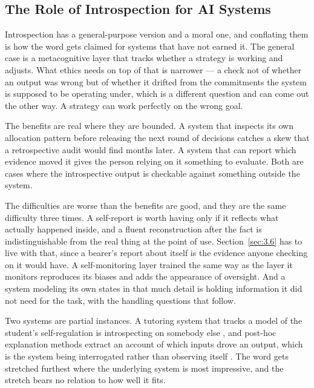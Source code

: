 \subsection{The Role of Introspection for AI Systems}
\label{sec:5.2.4}
Introspection has a general-purpose version and a moral one, and conflating them is how the word gets claimed for systems that have not earned it. The general case is a metacognitive layer that tracks whether a strategy is working and adjusts. What ethics needs on top of that is narrower — a check not of whether an output was wrong but of whether it drifted from the commitments the system is supposed to be operating under, which is a different question and can come out the other way. A strategy can work perfectly on the wrong goal.

The benefits are real where they are bounded. A system that inspects its own allocation pattern before releasing the next round of decisions catches a skew that a retrospective audit would find months later. A system that can report which evidence moved it gives the person relying on it something to evaluate. Both are cases where the introspective output is checkable against something outside the system.

The difficulties are worse than the benefits are good, and they are the same difficulty three times. A self-report is worth having only if it reflects what actually happened inside, and a fluent reconstruction after the fact is indistinguishable from the real thing at the point of use. Section~\ref{sec:3.6} has to live with that, since a bearer's report about itself is the evidence anyone checking on it would have. A self-monitoring layer trained the same way as the layer it monitors reproduces its biases and adds the appearance of oversight. And a system modeling its own states in that much detail is holding information it did not need for the task, with the handling questions that follow.

Two systems are partial instances. A tutoring system that tracks a model of the student's self-regulation is introspecting on somebody else \autocite{azevedo2011hypermedia}, and post-hoc explanation methods extract an account of which inputs drove an output, which is the system being interrogated rather than observing itself \autocite{gunning2019darpas}. The word gets stretched furthest where the underlying system is most impressive, and the stretch bears no relation to how well it fits.
